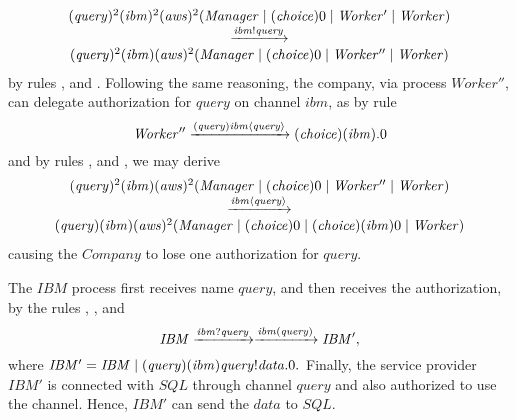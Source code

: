 $$ 
\begin{array}{c}
(\mathit{query})^2(\mathit{ibm})^2(\mathit{aws})^2(\mathit{Manager} \;|\; (\mathit{choice})0 \;|\; \mathit{Worker'} \;|\; \mathit{Worker})\\
\xrightarrow{\mathit{ibm}!\mathit{query}}
\\
(\mathit{query})^2(\mathit{ibm})(\mathit{aws})^2(\mathit{Manager} 
\;|\; (\mathit{choice})0 \;|\; \mathit{Worker''} \;|\; \mathit{Worker})
\end{array}
$$ 
by rules ,  and . 
%
Following the same reasoning, the company, via process $\mathit{Worker''}$, can delegate authorization for $\mathit{query}$ on channel $\mathit{ibm}$, as by
 rule 
%
$$\mathit{Worker''} \xrightarrow{{(\mathit{query})}\mathit{ibm}\langle\mathit{query}\rangle}
({\mathit{choice}})(\mathit{ibm}).0$$
%
and by rules ,  and , 
we may derive
%
$$ 
\begin{array}{c}
(\mathit{query})^2(\mathit{ibm})(\mathit{aws})^2(\mathit{Manager} 
\;|\; (\mathit{choice})0 \;|\; \mathit{Worker''} \;|\; \mathit{Worker})
\\
\xrightarrow{\mathit{ibm}\langle\mathit{query}\rangle}
\\
(\mathit{query})(\mathit{ibm})(\mathit{aws})^2(\mathit{Manager} \;|\; (\mathit{choice})0 \;|\; ({\mathit{choice}})(\mathit{ibm})0 \;|\; \mathit{Worker})
\end{array}$$
%
causing the $\mathit{Company}$
 to lose one authorization for $\mathit{query}$.

The $\mathit{IBM}$ process first receives name $\mathit{query}$, and then receives the authorization, by 
 the rules ,  ,   and 
%
$$
\mathit{IBM}
 \xrightarrow{\mathit{ibm}?\mathit{query}} 
 \xrightarrow{\mathit{ibm}(\mathit{query})}
\mathit{IBM'},
$$
%
where $\mathit{IBM'}= \mathit{IBM} \;|\; ({\mathit{query}})(\mathit{ibm})\mathit{query}!\mathit{data}.0.$
Finally, the service provider $\mathit{IBM'}$ is connected with $\mathit{SQL}$ through channel $\mathit{query}$ and also authorized to use the channel. Hence, $\mathit{IBM'}$ can send the $\mathit{data}$ to $\mathit{SQL}$.

